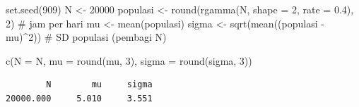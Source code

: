 \documentclass[
  indonesian,
  letterpaper,
]{book}
\newenvironment{Shaded}{\begin{snugshade}}{\end{snugshade}}
\newcommand{\AttributeTok}[1]{\textcolor[rgb]{0.40,0.45,0.13}{#1}}
\newcommand{\CommentTok}[1]{\textcolor[rgb]{0.37,0.37,0.37}{#1}}
\newcommand{\DecValTok}[1]{\textcolor[rgb]{0.68,0.00,0.00}{#1}}
\newcommand{\FloatTok}[1]{\textcolor[rgb]{0.68,0.00,0.00}{#1}}
\newcommand{\FunctionTok}[1]{\textcolor[rgb]{0.28,0.35,0.67}{#1}}
\newcommand{\NormalTok}[1]{\textcolor[rgb]{0.00,0.23,0.31}{#1}}
\newcommand{\OtherTok}[1]{\textcolor[rgb]{0.00,0.23,0.31}{#1}}
\newcommand{\SpecialCharTok}[1]{\textcolor[rgb]{0.37,0.37,0.37}{#1}}
\begin{document}
\begin{Shaded}
\begin{Highlighting}[]
\FunctionTok{set.seed}\NormalTok{(}\DecValTok{909}\NormalTok{)}
\NormalTok{N }\OtherTok{\textless{}{-}} \DecValTok{20000}
\NormalTok{populasi }\OtherTok{\textless{}{-}} \FunctionTok{round}\NormalTok{(}\FunctionTok{rgamma}\NormalTok{(N, }\AttributeTok{shape =} \DecValTok{2}\NormalTok{, }\AttributeTok{rate =} \FloatTok{0.4}\NormalTok{), }\DecValTok{2}\NormalTok{) }\CommentTok{\# jam per hari}
\NormalTok{mu }\OtherTok{\textless{}{-}} \FunctionTok{mean}\NormalTok{(populasi)}
\NormalTok{sigma }\OtherTok{\textless{}{-}} \FunctionTok{sqrt}\NormalTok{(}\FunctionTok{mean}\NormalTok{((populasi }\SpecialCharTok{{-}}\NormalTok{ mu)}\SpecialCharTok{\^{}}\DecValTok{2}\NormalTok{)) }\CommentTok{\# SD populasi (pembagi N)}

\FunctionTok{c}\NormalTok{(}\AttributeTok{N =}\NormalTok{ N, }\AttributeTok{mu =} \FunctionTok{round}\NormalTok{(mu, }\DecValTok{3}\NormalTok{), }\AttributeTok{sigma =} \FunctionTok{round}\NormalTok{(sigma, }\DecValTok{3}\NormalTok{))}
\end{Highlighting}
\end{Shaded}

\begin{verbatim}
        N        mu     sigma 
20000.000     5.010     3.551 
\end{verbatim}
\end{document}
